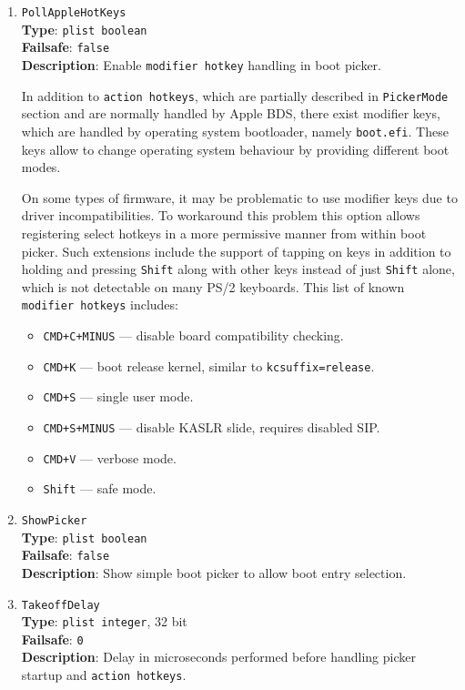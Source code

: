 \documentclass[]{article}
\providecommand{\tightlist}{%
  \setlength{\itemsep}{0pt}\setlength{\parskip}{0pt}}
\begin{document}
\begin{enumerate}
\item
  \texttt{PollAppleHotKeys}\\
  \textbf{Type}: \texttt{plist\ boolean}\\
  \textbf{Failsafe}: \texttt{false}\\
  \textbf{Description}: Enable \texttt{modifier hotkey} handling in boot picker.

  In addition to \texttt{action hotkeys}, which are partially described in \texttt{PickerMode}
  section and are normally handled by Apple BDS, there exist modifier keys, which are
  handled by operating system bootloader, namely \texttt{boot.efi}. These keys
  allow to change operating system behaviour by providing different boot modes.

  On some types of firmware, it may be problematic to use modifier keys due to driver
  incompatibilities. To workaround this problem this option allows registering select hotkeys
  in a more permissive manner from within boot picker. Such extensions include the support
  of tapping on keys in addition to holding and pressing \texttt{Shift} along with
  other keys instead of just \texttt{Shift} alone, which is not detectable on many
  PS/2 keyboards. This list of known \texttt{modifier hotkeys} includes:
  \begin{itemize}
  \tightlist
  \item \texttt{CMD+C+MINUS} --- disable board compatibility checking.
  \item \texttt{CMD+K} --- boot release kernel, similar to \texttt{kcsuffix=release}.
  \item \texttt{CMD+S} --- single user mode.
  \item \texttt{CMD+S+MINUS} --- disable KASLR slide, requires disabled SIP.
  \item \texttt{CMD+V} --- verbose mode.
  \item \texttt{Shift} --- safe mode.
  \end{itemize}

\item
  \texttt{ShowPicker}\\
  \textbf{Type}: \texttt{plist\ boolean}\\
  \textbf{Failsafe}: \texttt{false}\\
  \textbf{Description}: Show simple boot picker to allow boot entry selection.

\item
  \texttt{TakeoffDelay}\\
  \textbf{Type}: \texttt{plist\ integer}, 32 bit\\
  \textbf{Failsafe}: \texttt{0}\\
  \textbf{Description}: Delay in microseconds performed before handling
  picker startup and \texttt{action hotkeys}.


\end{enumerate}
\end{document}
